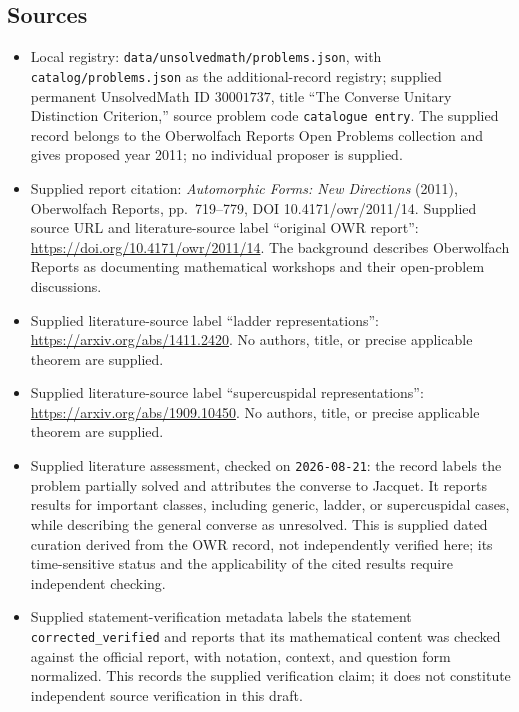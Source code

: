 \documentclass[11pt]{article}
\begin{document}
\subsection{Sources}
\begin{itemize}
\item Local registry: \texttt{data/unsolvedmath/problems.json}, with \texttt{catalog/problems.json} as the additional-record registry; supplied permanent UnsolvedMath ID \(30001737\), title ``The Converse Unitary Distinction Criterion,'' source problem code \texttt{catalogue entry}. The supplied record belongs to the Oberwolfach Reports Open Problems collection and gives proposed year 2011; no individual proposer is supplied.
\item Supplied report citation: \emph{Automorphic Forms: New Directions} (2011), Oberwolfach Reports, pp.~719--779, DOI 10.4171/owr/2011/14. Supplied source URL and literature-source label ``original OWR report'': \url{https://doi.org/10.4171/owr/2011/14}. The background describes Oberwolfach Reports as documenting mathematical workshops and their open-problem discussions.
\item Supplied literature-source label ``ladder representations'': \url{https://arxiv.org/abs/1411.2420}. No authors, title, or precise applicable theorem are supplied.
\item Supplied literature-source label ``supercuspidal representations'': \url{https://arxiv.org/abs/1909.10450}. No authors, title, or precise applicable theorem are supplied.
\item Supplied literature assessment, checked on \texttt{2026-08-21}: the record labels the problem partially solved and attributes the converse to Jacquet. It reports results for important classes, including generic, ladder, or supercuspidal cases, while describing the general converse as unresolved. This is supplied dated curation derived from the OWR record, not independently verified here; its time-sensitive status and the applicability of the cited results require independent checking.
\item Supplied statement-verification metadata labels the statement \texttt{corrected\_verified} and reports that its mathematical content was checked against the official report, with notation, context, and question form normalized. This records the supplied verification claim; it does not constitute independent source verification in this draft.
\end{itemize}
\end{document}
